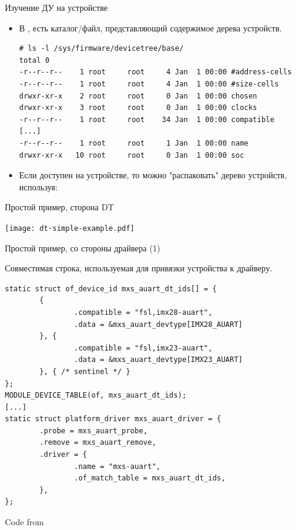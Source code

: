 \documentclass[obeyspaces,spaces,hyphens]{beamer}
\begin{document}
\begin{frame}[fragile]{Изучение ДУ на устройстве}
  \begin{itemize}
  \item В , есть каталог/файл, представляющий содержимое дерева устройств.
{\footnotesize
    \begin{block}{}
\begin{verbatim}
# ls -l /sys/firmware/devicetree/base/
total 0
-r--r--r--    1 root     root     4 Jan  1 00:00 #address-cells
-r--r--r--    1 root     root     4 Jan  1 00:00 #size-cells
drwxr-xr-x    2 root     root     0 Jan  1 00:00 chosen
drwxr-xr-x    3 root     root     0 Jan  1 00:00 clocks
-r--r--r--    1 root     root    34 Jan  1 00:00 compatible
[...]
-r--r--r--    1 root     root     1 Jan  1 00:00 name
drwxr-xr-x   10 root     root     0 Jan  1 00:00 soc
\end{verbatim}
    \end{block}
}
  \item Если  доступен на устройстве, то можно "распаковать" дерево устройств, используя:\\
  \end{itemize}
\end{frame}

\begin{frame}{Простой пример, сторона DT}
  \begin{center}
    \texttt{[image: dt-simple-example.pdf]}
  \end{center}
\end{frame}

\begin{frame}[fragile]{Простой пример, со стороны драйвера (1)}
  \begin{block}{Совместимая строка, используемая для привязки устройства к драйверу.}
    \begin{verbatim}
static struct of_device_id mxs_auart_dt_ids[] = {
        {
                .compatible = "fsl,imx28-auart",
                .data = &mxs_auart_devtype[IMX28_AUART]
        }, {
                .compatible = "fsl,imx23-auart",
                .data = &mxs_auart_devtype[IMX23_AUART]
        }, { /* sentinel */ }
};
MODULE_DEVICE_TABLE(of, mxs_auart_dt_ids);
[...]
static struct platform_driver mxs_auart_driver = {
        .probe = mxs_auart_probe,
        .remove = mxs_auart_remove,
        .driver = {
                .name = "mxs-auart",
                .of_match_table = mxs_auart_dt_ids,
        },
};
    \end{verbatim}
  \end{block}
  Code from 
\end{frame}
\end{document}
